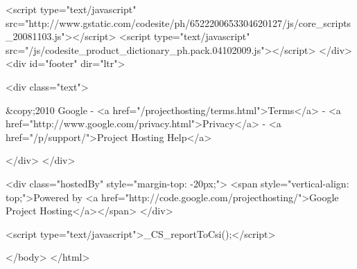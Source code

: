  
 
 <script type="text/javascript" src="http://www.gstatic.com/codesite/ph/6522200653304620127/js/core_scripts_20081103.js"></script>
 <script type="text/javascript" src="/js/codesite_product_dictionary_ph.pack.04102009.js"></script>
 </div>
<div id="footer" dir="ltr">
 
 <div class="text">
 
 &copy;2010 Google -
 <a href="/projecthosting/terms.html">Terms</a> -
 <a href="http://www.google.com/privacy.html">Privacy</a> -
 <a href="/p/support/">Project Hosting Help</a>
 
 </div>
</div>

 <div class="hostedBy" style="margin-top: -20px;">
 <span style="vertical-align: top;">Powered by <a href="http://code.google.com/projecthosting/">Google Project Hosting</a></span>
 </div>
 
 


 
 
 <script type="text/javascript">_CS_reportToCsi();</script>
 
 </body>
</html>

